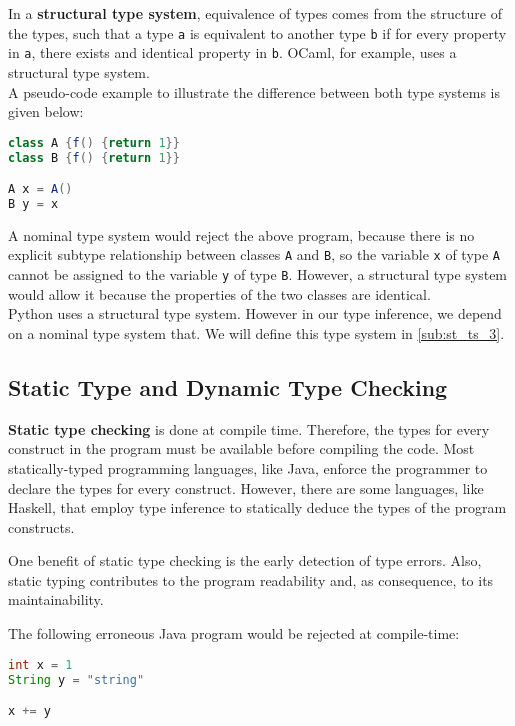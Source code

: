 In a \textbf{structural type system}, equivalence of types comes from the structure of the types, such that a type \lstinline|a| is equivalent to another type \lstinline|b| if for every property in \lstinline|a|, there exists and identical property in \lstinline|b|. OCaml, for example, uses a structural type system. \\

A pseudo-code example to illustrate the difference between both type systems is given below:
\begin{lstlisting}[language=java]
class A {f() {return 1}}
class B {f() {return 1}}

A x = A()
B y = x
\end{lstlisting}

A nominal type system would reject the above program, because there is no explicit subtype relationship between classes \lstinline|A| and \lstinline|B|, so the variable \lstinline|x| of type \lstinline|A| cannot be assigned to the variable \lstinline|y| of type \lstinline|B|. However, a structural type system would allow it because the properties of the two classes are identical. \\

Python uses a structural type system. However in our type inference, we depend on a nominal type system that. We will define this type system in \ref{sub:st_ts_3}.

\subsection{Static Type and Dynamic Type Checking}

\textbf{Static type checking} is done at compile time. Therefore, the types for every construct in the program must be available before compiling the code. Most statically-typed programming languages, like Java, enforce the programmer to declare the types for every construct. However, there are some languages, like Haskell, that employ type inference to statically deduce the types of the program constructs.

One benefit of static type checking is the early detection of type errors. Also, static typing contributes to the program readability and, as consequence, to its maintainability.

The following erroneous Java program would be rejected at compile-time:
\begin{lstlisting}[language=java]
int x = 1
String y = "string"

x += y
\end{lstlisting}

